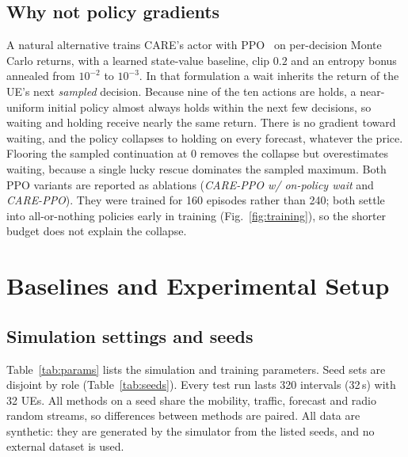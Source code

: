 \documentclass[conference]{IEEEtran}
\begin{document}
\subsection{Why not policy gradients}
A natural alternative trains CARE's actor with PPO~\cite{schulman2017ppo} on per-decision Monte Carlo returns, with a learned state-value baseline, clip $0.2$ and an entropy bonus annealed from $10^{-2}$ to $10^{-3}$. In that formulation a wait inherits the return of the UE's next \emph{sampled} decision. Because nine of the ten actions are holds, a near-uniform initial policy almost always holds within the next few decisions, so waiting and holding receive nearly the same return. There is no gradient toward waiting, and the policy collapses to holding on every forecast, whatever the price. Flooring the sampled continuation at $0$ removes the collapse but overestimates waiting, because a single lucky rescue dominates the sampled maximum. Both PPO variants are reported as ablations (\emph{CARE-PPO w/ on-policy wait} and \emph{CARE-PPO}). They were trained for 160 episodes rather than 240; both settle into all-or-nothing policies early in training (Fig.~\ref{fig:training}), so the shorter budget does not explain the collapse.

\section{Baselines and Experimental Setup}\label{sec:protocol}
\subsection{Simulation settings and seeds}
Table~\ref{tab:params} lists the simulation and training parameters. Seed sets are disjoint by role (Table~\ref{tab:seeds}). Every test run lasts 320 intervals (32\,s) with 32 UEs. All methods on a seed share the mobility, traffic, forecast and radio random streams, so differences between methods are paired. All data are synthetic: they are generated by the simulator from the listed seeds, and no external dataset is used.
\end{document}

